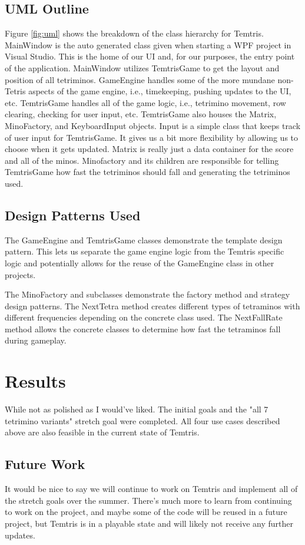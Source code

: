 \documentclass[10pt,conference,onecolumn,compsoc]{IEEEtran}
\begin{document}
\subsection{UML Outline}
Figure \ref{fig:uml} shows the breakdown of the class hierarchy for Temtris. MainWindow is the auto generated class given when starting a WPF project in Visual Studio. This is the home of our UI and, for our purposes, the entry point of the application. MainWindow utilizes TemtrisGame to get the layout and position of all tetriminos. GameEngine handles some of the more mundane non-Tetris aspects of the game engine, i.e., timekeeping, pushing updates to the UI, etc. TemtrisGame handles all of the game logic, i.e., tetrimino movement, row clearing, checking for user input, etc. TemtrisGame also houses the Matrix, MinoFactory, and KeyboardInput objects. Input is a simple class that keeps track of user input for TemtrisGame. It gives us a bit more flexibility by allowing us to choose when it gets updated. Matrix is really just a data container for the score and all of the minos. Minofactory and its children are responsible for telling TemtrisGame how fast the tetriminos should fall and generating the tetriminos used.

\subsection{Design Patterns Used}
The GameEngine and TemtrisGame classes demonstrate the template design pattern. This lets us separate the game engine logic from the Temtris specific logic and potentially allows for the reuse of the GameEngine class in other projects.

The MinoFactory and subclasses demonstrate the factory method and strategy design patterns. The NextTetra method creates different types of tetraminos with different frequencies depending on the concrete class used. The NextFallRate method allows the concrete classes to determine how fast the tetraminos fall during gameplay.


\section{Results}
While not as polished as I would've liked. The initial goals and the "all 7 tetrimino variants" stretch goal were completed. All four use cases described above are also feasible in the current state of Temtris.

\subsection{Future Work}
It would be nice to say we will continue to work on Temtris and implement all of the stretch goals over the summer. There's much more to learn from continuing to work on the project, and maybe some of the code will be reused in a future project, but Temtris is in a playable state and will likely not receive any further updates.

\end{document}
